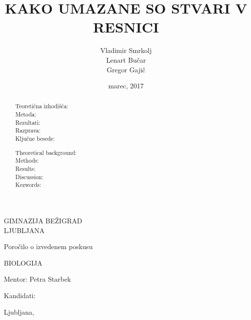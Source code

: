 \documentclass[12pt, a4paper, oneside]{report}
\begin{document}
\title{KAKO UMAZANE SO STVARI V RESNICI}
\author{Vladimir Smrkolj\\Lenart Bučar\\Gregor Gajič}
\date{marec, 2017}

\sffamily

\begin{titlepage}
\centering


{\Large{GIMNAZIJA BEŽIGRAD\\[2mm]LJUBLJANA}}

\vspace{3.5cm}

{\large Poročilo o izvedenem poskusu

\vspace{1cm}

BIOLOGIJA
}

\vspace{3.5cm}

\makeatletter
{\LARGE{\textbf{\@title}}}
\makeatother


\vfill


\parbox{4cm}{Mentor: Petra Starbek}
\hfill
\makeatletter
Kandidati: \parbox[t]{3cm}{\@author}
\makeatother

\vspace{3cm}

\makeatletter
Ljubljana, \@date
\makeatother

\end{titlepage}




\begin{abstract}
\begin{description}

\item[Teoretična izhodišča:]

\item[Metoda:]

\item[Rezultati:]

\item[Razprava:]

\item[Ključne besede:]

\end{description}
\end{abstract}


\begin{abstract}
\begin{description}

\item[Theoretical background:]

\item[Methods:]

\item[Results:]

\item[Discussion:]

\item[Kezwords:]

\end{description}
\end{abstract}
\end{document}
